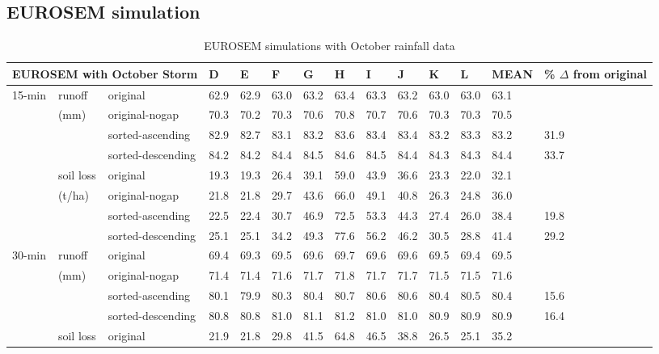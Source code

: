 \subsection{EUROSEM simulation}
\label{sec:EUROSEMSimulation}

\begin{table}
  \centering
  \small
  \caption{EUROSEM simulations with October rainfall data}
  \label{tab:EUROSEMSimulationsWithOctoberRainfallData}
    \begin{tabular}{llllllllllllll}
\toprule
\multicolumn{3}{c}{EUROSEM with October Storm} & D & E & F & G & H & I & J & K &
L & MEAN & \% $\Delta$ from original \\
\midrule
15-min & runoff & original & 62.9 & 62.9 & 63.0 & 63.2 & 63.4 & 63.3 & 63.2 &
63.0 & 63.0 & 63.1 &  \\
 & (mm) & original-nogap & 70.3 & 70.2 & 70.3 & 70.6 & 70.8 & 70.7 & 70.6 & 70.3
& 70.3 & 70.5 & \\
 &  & sorted-ascending & 82.9 & 82.7 & 83.1 & 83.2 & 83.6 & 83.4 & 83.4 & 83.2 &
83.3 & 83.2 & 31.9 \\
 &  & sorted-descending & 84.2 &  84.2 &  84.4 &  84.5 &  84.6 &  84.5 &  84.4 &
84.3 &  84.3 &  84.4 &  33.7\\
 & soil loss  & original & 19.3 & 19.3 & 26.4 & 39.1 & 59.0 & 43.9 & 36.6 & 23.3
& 22.0 & 32.1 &  \\
 & (t/ha) & original-nogap &  21.8 &  21.8 &  29.7 &  43.6 &  66.0 &  49.1 &
40.8 &  26.3 &  24.8 &  36.0 & \\
 &  & sorted-ascending & 22.5 & 22.4 & 30.7 & 46.9 & 72.5 & 53.3 & 44.3 & 27.4 &
26.0 & 38.4 & 19.8 \\
 &  & sorted-descending & 25.1 &  25.1 &  34.2 &  49.3 &  77.6 &  56.2 &  46.2 &
30.5 &  28.8 &  41.4 &  29.2\\
\midrule
30-min & runoff  & original & 69.4 & 69.3 & 69.5 & 69.6 & 69.7 & 69.6 & 69.6 &
69.5 & 69.4 & 69.5 &  \\
 & (mm) & original-nogap &  71.4 &  71.4 &  71.6 &  71.7 &  71.8 &  71.7 &  71.7
& 71.5 &  71.5 &  71.6 & \\
 &  & sorted-ascending & 80.1 & 79.9 & 80.3 & 80.4 & 80.7 & 80.6 & 80.6 & 80.4 &
80.5 & 80.4 & 15.6 \\
 &  & sorted-descending & 80.8 &  80.8 &  81.0 &  81.1 &  81.2 &  81.0 &  81.0 &
80.9 &  80.9 &  80.9 &  16.4\\
 & soil loss  & original & 21.9 & 21.8 & 29.8 & 41.5 & 64.8 & 46.5 & 38.8 & 26.5
& 25.1 & 35.2 &  \\

\end{tabular}
\end{table}
